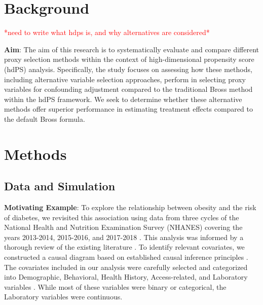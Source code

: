 \documentclass[sn-vancouver,Numbered,lineno,pdflatex]{sn-jnl}
\begin{document}

\maketitle

\section{Background}\label{background}

\textcolor{red}{*need to write what hdps is, and why alternatives are considered*}

\textbf{Aim}: The aim of this research is to systematically evaluate and
compare different proxy selection methods within the context of
high-dimensional propensity score (hdPS) analysis. Specifically, the
study focuses on assessing how these methods, including alternative
variable selection approaches, perform in selecting proxy variables for
confounding adjustment compared to the traditional Bross method within
the hdPS framework. We seek to determine whether these alternative
methods offer superior performance in estimating treatment effects
compared to the default Bross formula.

\section{Methods}\label{methods}

\subsection*{Data and Simulation}\label{data-and-simulation}

\textbf{Motivating Example}: To explore the relationship between obesity
and the risk of diabetes, we revisited this association using data from
three cycles of the National Health and Nutrition Examination Survey
(NHANES) covering the years 2013-2014, 2015-2016, and 2017-2018
\citep{karim2024high}. This analysis was informed by a thorough review
of the existing literature
\citep{saydah2014trends, liu2013association, kabadi2012joint, ostchega2012abdominal}.
To identify relevant covariates, we constructed a causal diagram based
on established causal inference principles \citep{greenland1999causal}.
The covariates included in our analysis were carefully selected and
categorized into Demographic, Behavioral, Health History,
Access-related, and Laboratory variables \citep{karim2024high}. While
most of these variables were binary or categorical, the Laboratory
variables were continuous.
\end{document}
